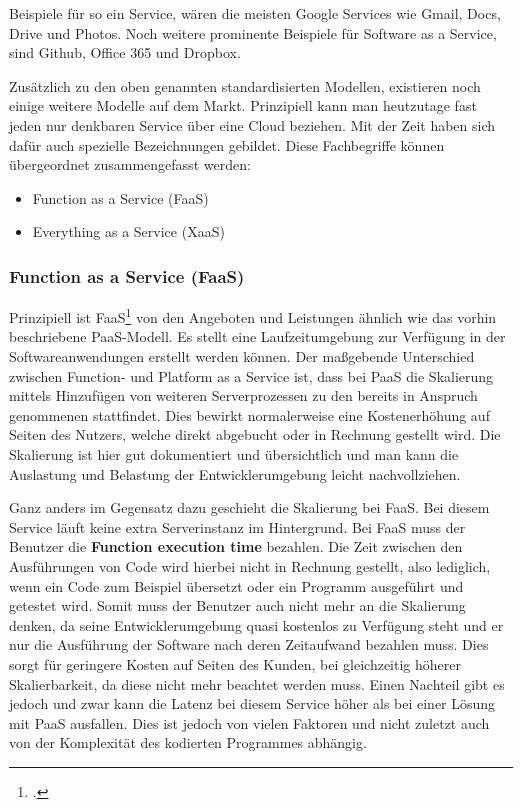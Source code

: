Beispiele für so ein Service, wären die meisten Google Services wie Gmail, Docs, Drive und Photos. Noch weitere prominente Beispiele für Software as a Service, sind Github, Office 365 und Dropbox.

Zusätzlich zu den oben genannten standardisierten Modellen, existieren noch einige weitere Modelle auf dem Markt. Prinzipiell
kann man heutzutage fast jeden nur denkbaren Service über eine Cloud beziehen.
Mit der Zeit haben sich dafür auch spezielle Bezeichnungen gebildet. Diese Fachbegriffe können übergeordnet zusammengefasst werden:
\begin{itemize}
	\item Function as a Service (FaaS)
	\item Everything as a Service (XaaS)
\end{itemize}

\subsubsection{Function as a Service (FaaS)}
Prinzipiell ist FaaS\footcite{cloud-ms} von den Angeboten und Leistungen ähnlich wie das vorhin beschriebene PaaS-Modell.
Es stellt eine Laufzeitumgebung zur Verfügung in der Softwareanwendungen erstellt werden können.
Der maßgebende Unterschied zwischen Function- und Platform as a Service ist, dass bei PaaS die Skalierung mittels Hinzufügen von weiteren Serverprozessen zu den bereits in Anspruch genommenen stattfindet.
Dies bewirkt normalerweise eine Kostenerhöhung auf Seiten des Nutzers, welche direkt abgebucht oder in Rechnung gestellt wird.
Die Skalierung ist hier gut dokumentiert und übersichtlich und man kann die Auslastung und Belastung der Entwicklerumgebung leicht nachvollziehen.

Ganz anders im Gegensatz dazu geschieht die Skalierung bei FaaS. Bei diesem Service läuft keine extra Serverinstanz im Hintergrund. Bei FaaS muss der Benutzer die \textbf{Function execution time} bezahlen. Die Zeit zwischen den Ausführungen von Code wird hierbei nicht in Rechnung gestellt, also lediglich, wenn ein Code zum Beispiel übersetzt oder ein Programm ausgeführt und getestet wird. Somit muss der Benutzer auch nicht mehr an die Skalierung denken, da seine Entwicklerumgebung quasi kostenlos zu Verfügung steht und er nur die Ausführung der Software nach deren Zeitaufwand bezahlen muss.
Dies sorgt für geringere Kosten auf Seiten des Kunden, bei gleichzeitig höherer Skalierbarkeit, da diese nicht mehr beachtet werden muss.
Einen Nachteil gibt es jedoch und zwar kann die Latenz bei diesem Service höher als bei einer Lösung mit PaaS ausfallen.
Dies ist jedoch von vielen Faktoren und nicht zuletzt auch von der Komplexität des kodierten Programmes abhängig.

